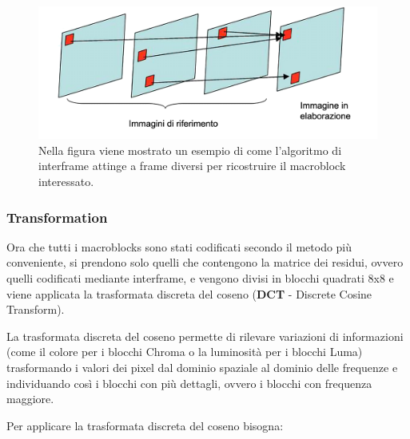 \documentclass[a4paper,12pt, oneside]{article}
\begin{document}
\begin{figure}[h]
    \centering
    \includegraphics[width=1\textwidth]{images/interframe.png}
    \caption{Nella figura viene mostrato un esempio di come l'algoritmo di interframe
    attinge a frame diversi per ricostruire il macroblock interessato.}
    \label{fig:interframe}
\end{figure}

\subsubsection{Transformation}
Ora che tutti i macroblocks sono stati codificati secondo il metodo più conveniente, si prendono solo quelli che contengono
la matrice dei residui, ovvero quelli codificati mediante interframe, e vengono divisi in blocchi quadrati 8x8
e viene applicata la trasformata discreta del coseno (\textbf{DCT} - Discrete Cosine Transform).

La trasformata discreta del coseno permette di rilevare variazioni di informazioni (come il colore per
i blocchi Chroma o la luminosità per i blocchi Luma) trasformando i valori dei pixel dal dominio
spaziale al dominio delle frequenze e individuando così i blocchi con più dettagli, ovvero i blocchi
con frequenza maggiore.

Per applicare la trasformata discreta del coseno bisogna:
\end{document}
